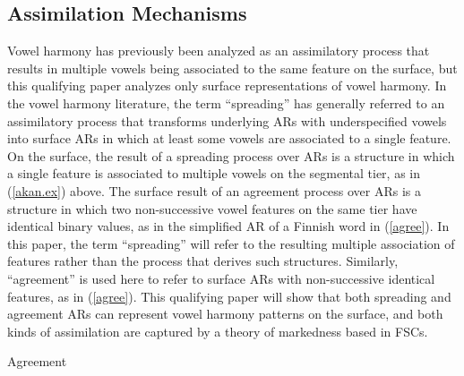 \documentclass[,doc,floatsintext]{apa6}
\theoremstyle{definition}
\theoremstyle{definition}
\theoremstyle{definition}
\theoremstyle{remark}
\begin{document}
\subsection{Assimilation Mechanisms}\label{assimilation-mechanisms}

Vowel harmony has previously been analyzed as an assimilatory process
that results in multiple vowels being associated to the same feature on
the surface, but this qualifying paper analyzes only surface
representations of vowel harmony. In the vowel harmony literature, the
term \enquote{spreading} has generally referred to an assimilatory
process that transforms underlying ARs with underspecified vowels into
surface ARs in which at least some vowels are associated to a single
feature. On the surface, the result of a spreading process over ARs is a
structure in which a single feature is associated to multiple vowels on
the segmental tier, as in (\ref{akan.ex}) above. The surface result of
an agreement process over ARs is a structure in which two non-successive
vowel features on the same tier have identical binary values, as in the
simplified AR of a Finnish word in (\ref{agree}). In this paper, the
term \enquote{spreading} will refer to the resulting multiple
association of features rather than the process that derives such
structures. Similarly, \enquote{agreement} is used here to refer to
surface ARs with non-successive identical features, as in (\ref{agree}).
This qualifying paper will show that both spreading and agreement ARs
can represent vowel harmony patterns on the surface, and both kinds of
assimilation are captured by a theory of markedness based in FSCs.

\begin{exe}
\ex Agreement \label{agree} \\
\end{exe}
\end{document}
